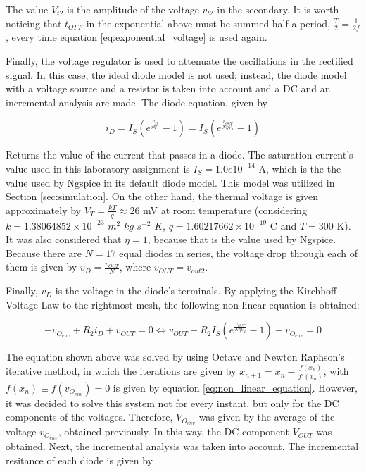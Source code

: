 The value $V_{t2}$ is the amplitude of the voltage $v_{t2}$ in the secondary. It is worth noticing that $t_{OFF}$ in the exponential above must be summed half a period, $\frac{T}{2}=\frac{1}{2f}$, every time equation \ref{eq:exponential_voltage} is used again.

\par

Finally, the voltage regulator is used to attenuate the oscillations in the rectified signal. In this case, the ideal diode model is not used; instead, the diode model with a voltage source and a resistor is taken into account and a DC and an incremental analysis are made. The diode equation, given by

\begin{equation} \label{eq:diode_equation}
  i_D=I_S\left(e^{\frac{v_D}{\eta V_T}}-1\right)=I_S\left(e^{\frac{v_{OUT}}{N\eta V_T}}-1\right)
\end{equation}

Returns the value of the current that passes in a diode. The saturation current's value used in this laboratory assignment is $I_S=1.0e10^{-14}$ A, which is the the value used by Ngspice in its default diode model. This model was utilized in Section \ref{sec:simulation}. On the other hand, the thermal voltage is given approximately by $V_T=\frac{kT}{q}\approx 26$ mV at room temperature (considering $k=1.38064852\times10^{-23}$ $m^2$ $kg$ $s^{-2}$ $K$, $q=1.60217662\times10^{-19}$ C and $T=300$ K). It was also considered that $\eta=1$, because that is the value used by Ngspice. Because there are $N=17$ equal diodes in series, the voltage drop through each of them is given by $v_D=\frac{v_{OUT}}{N}$, where $v_{OUT}=v_{out2}$.

Finally, $v_D$ is the voltage in the diode's terminals. By applying the Kirchhoff Voltage Law to the rightmost mesh, the following non-linear equation is obtained:

\begin{equation} \label{eq:non_linear_equation}
  -v_{O_{env}}+R_2i_D+v_{OUT}=0 \Leftrightarrow v_{OUT}+R_2I_S\left(e^{\frac{v_{OUT}}{N\eta V_T}}-1\right)-v_{O_{env}}=0
\end{equation}

The equation shown above was solved by using Octave and Newton Raphson's iterative method, in which the iterations are given by $x_{n+1}=x_{n}-\frac{f(x_n)}{f'(x_n)}$, with $f(x_n)\equiv f(v_{O_{env}})=0$ is given by equation \ref{eq:non_linear_equation}. However, it was decided to solve this system not for every instant, but only for the DC components of the voltages. Therefore, $V_{O_{env}}$ was given by the average of the voltage $v_{O_{env}}$, obtained previously. In this way, the DC component $V_{OUT}$ was obtained. Next, the incremental analysis was taken into account. The incremental resitance of each diode is given by

